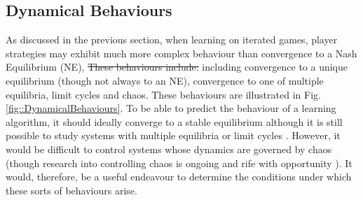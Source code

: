 \documentclass[sigconf]{aamas}
\begin{document}
\subsection{Dynamical Behaviours}
\label{sec::DynamicalBehaviours}

    As discussed in the previous section, when learning on iterated games, player
    strategies may exhibit much more complex behaviour than
    convergence to a Nash Equilibrium (NE), \st{These behaviours include:}
    including convergence to a unique
    equilibrium (though not always to an NE), convergence to one of
    multiple equilibria, limit cycles and chaos. These behaviours are
    illustrated in Fig.\ref{fig::DynamicalBehaviours}. To be able to predict the behaviour of a learning algorithm, it should ideally converge to a stable equilibrium
    although it is still possible to study systems with multiple
    equilibria or limit cycles \cite{Strogatz2000}. However, it would
    be difficult to control systems whose dynamics are governed by
    chaos (though research into controlling chaos is ongoing and rife
    with opportunity \cite{Fradkov2009}). It would, therefore, be a useful endeavour to
    determine the conditions under which these sorts of behaviours
    arise.
\end{document}
